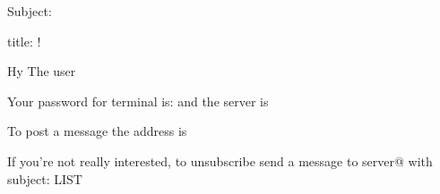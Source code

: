 Subject:

title: !

Hy %
The user %

Your password for terminal is:
and the server is %

To post a message the address is %

If you're not really interested, to unsubscribe send a message to server@%
with subject:
LIST %
